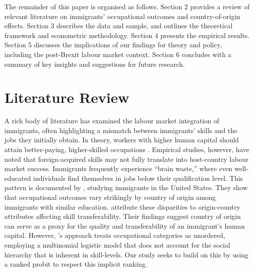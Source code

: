 \documentclass[12pt, a4paper]{article}
\begin{document}
The remainder of this paper is organised as follows. Section 2 provides a review of relevant literature on immigrants’ occupational outcomes and country-of-origin effects. Section 3 describes the data and sample, and outlines the theoretical framework and econometric methodology. Section 4 presents the empirical results. Section 5 discusses the implications of our findings for theory and policy, including the post-Brexit labour market context. Section 6 concludes with a summary of key insights and suggestions for future research.


\section{Literature Review} \label{sec:lit}
A rich body of literature has examined the labour market integration of immigrants, often highlighting a mismatch between immigrants’ skills and the jobs they initially obtain. In theory, workers with higher human capital should attain better-paying, higher-skilled occupations \citep{BeckerHumanCap}. Empirical studies, however, have noted that foreign-acquired skills may not fully translate into host-country labour market success. Immigrants frequently experience “brain waste,” where even well-educated individuals find themselves in jobs below their qualification level. This pattern is documented by \citet{MattooBrainWaste}, studying immigrants in the United States. They show that occupational outcomes vary strikingly by country of origin among immigrants with similar education. \citet{MattooBrainWaste} attribute these disparities to origin-country attributes affecting skill transferability. Their findings suggest country of origin can serve as a proxy for the quality and transferability of an immigrant’s human capital. However, \citet{MattooBrainWaste}'s approach treats occupational categories as unordered, employing a multinomial logistic model that does not account for the social hierarchy that is inherent in skill-levels. Our study seeks to build on this by using a ranked probit to respect this implicit ranking.
\end{document}
